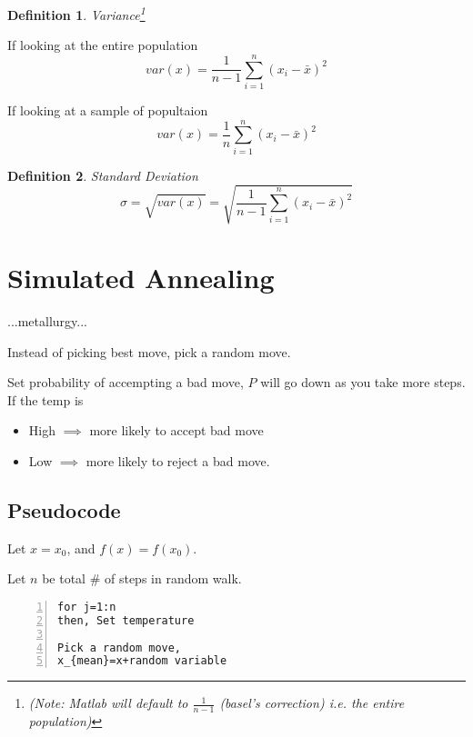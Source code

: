 \documentclass[12pt]{book}
\newtheorem*{definition*}{Definition}
\begin{document}
\begin{definition*}Variance\footnote[1]{(Note: Matlab will default to $\frac{1}{n-1}$ (basel's correction) i.e. the entire population)}\\
\end{definition*}
\indent If looking at the entire population
$$var(x)=\frac{1}{n-1} \sum\limits_{i=1}^{n} (x_{i}-\bar{x})^{2}$$


If looking at a sample of popultaion
$$var(x)=\frac{1}{n} \sum\limits_{i=1}^{n} (x_{i}-\bar{x})^{2}$$



\begin{definition*}Standard Deviation
$$\sigma = \sqrt{var(x)}=\sqrt{\frac{1}{n-1} \sum\limits_{i=1}^{n} (x_{i}-\bar{x})^{2}}$$
\end{definition*}







\chapter{Simulated Annealing}

...metallurgy...

\noindent Instead of picking best move, pick a random move. 

Set probability of accempting a bad move, $P$ will go down as you take more steps. \\

\noindent If the temp is
\begin{itemize}
\item High $\implies{}$ more likely to accept bad move
\item Low $\implies{}$ more likely to reject a bad move.
\end{itemize}


\newpage
\section{Pseudocode}

Let $x=x_{0}$, and $f(x)=f(x_{0})$.

Let $n$ be total $\#$ of steps in random walk.


\begin{Verbatim}[numbers=left, frame=single, formatcom=\color{black}]
for j=1:n
then, Set temperature

Pick a random move, 
x_{mean}=x+random variable
\end{Verbatim}





\backmatter
%
\begin{thebibliography}{99}
\end{thebibliography}
\end{document}
